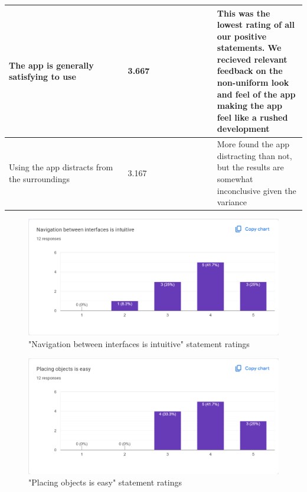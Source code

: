 \documentclass[12pt, titlepage]{article}
\begin{document}
\begin{table}[htbp]
{\begin{tabular}{|p{0.4\linewidth}|p{0.3\linewidth}|p{0.7\linewidth}|}
      \hline
      The app is generally satisfying to use        & 3.667                                                & This was the lowest rating of all our positive statements. We recieved relevant feedback on the non-uniform look and feel of the app making the app feel like a rushed development \\
      \hline
      Using the app distracts from the surroundings & 3.167                                                & More found the app distracting than not, but the results are somewhat inconclusive given the variance                                                                              \\
      \hline
    \end{tabular}}
  \label{table:US1}
\end{table}

\begin{figure}[htbp]
  \caption{"Navigation between interfaces is intuitive" statement ratings}
  \centerline{\includegraphics[scale=0.35]{./Images/Q1.png}}
  \label{fig:StraightForward}
\end{figure}

\begin{figure}[htbp]
  \caption{"Placing objects is easy" statement ratings}
  \centerline{\includegraphics[scale=0.35]{./Images/Q2.png}}
  \label{fig:Navigation}
\end{figure}
\end{document}
